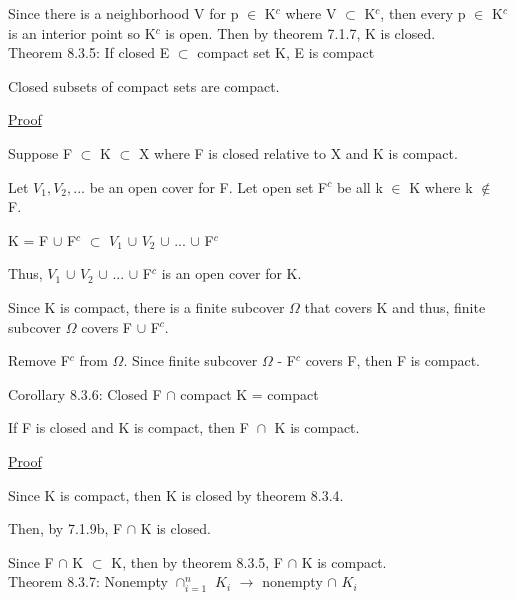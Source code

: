 	Since there is a neighborhood V for p $\in$ K$^c$ where V $\subset$ K$^c$,
	then every p $\in$ K$^c$ is an interior point so K$^c$ is open.
	Then by {\color{red} theorem 7.1.7}, K is closed. \\

{ \color{red} Theorem 8.3.5: If closed E $\subset$ compact set K, E is compact } 

	\begin{adjustbox}{minipage=14cm, right, vspace=0.1cm 0cm}
		Closed subsets of compact sets are compact.
	\end{adjustbox}

{ \color{magenta} \underline{Proof} } 

	Suppose F $\subset$ K $\subset$ X where F is closed relative to X
	and K is compact.

	Let $V_1, V_2, ...$ be an open cover for F.
	Let open set F$^c$ be all k $\in$ K where k $\not \in$ F.

	\qquad K = F $\cup$ F$^c$ $\subset$ $V_1$ $\cup$ $V_2$ $\cup$ ... $\cup$ F$^c$

	Thus, $V_1$ $\cup$ $V_2$ $\cup$ ... $\cup$ F$^c$ is an open cover for K.

	Since K is compact, there is a finite subcover $\Omega$ that covers K
	and thus, finite subcover $\Omega$ covers F $\cup$ F$^c$.
	
	Remove F$^c$ from $\Omega$. Since finite subcover $\Omega$ - F$^c$ covers F,
	then F is compact. \\

\newpage

{ \color{orange} Corollary 8.3.6: Closed F $\cap$ compact K = compact } 

	\begin{adjustbox}{minipage=14cm, right, vspace=0.1cm 0cm}
		If F is closed and K is compact, then F $\cap_{}^{}$ K is compact.
	\end{adjustbox}

{ \color{magenta} \underline{Proof} } 

	Since K is compact, then K is closed by {\color{red} theorem 8.3.4}.

	Then, by {\color{red} 7.1.9b}, F $\cap$ K is closed.

	Since F $\cap$ K $\subset$ K, then by {\color{red} theorem 8.3.5},
	F $\cap$ K is compact. \\

{ \color{red} Theorem 8.3.7: Nonempty $\cap_{i=1}^n$ $K_i$ $\rightarrow$
nonempty $\cap$ $K_i$ } 

